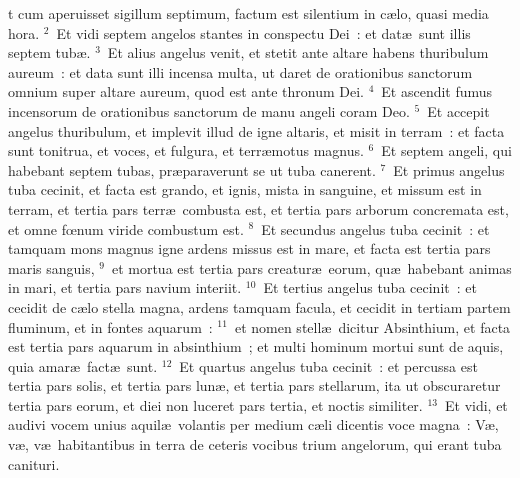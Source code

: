 \bchapter
{}t cum aperuisset sigillum septimum, factum est silentium in c\ae lo, quasi media hora.
${}^{2}$~Et vidi septem angelos stantes in conspectu Dei~: et dat\ae\ sunt illis septem tub\ae .
${}^{3}$~Et alius angelus venit, et stetit ante altare habens thuribulum aureum~: et data sunt illi incensa multa, ut daret de orationibus sanctorum omnium super altare aureum, quod est ante thronum Dei.
${}^{4}$~Et ascendit fumus incensorum de orationibus sanctorum de manu angeli coram Deo.
${}^{5}$~Et accepit angelus thuribulum, et implevit illud de igne altaris, et misit in terram~: et facta sunt tonitrua, et voces, et fulgura, et terr\ae motus magnus.
${}^{6}$~Et septem angeli, qui habebant septem tubas, pr\ae paraverunt se ut tuba canerent.
${}^{7}$~Et primus angelus tuba cecinit, et facta est grando, et ignis, mista in sanguine, et missum est in terram, et tertia pars terr\ae\ combusta est, et tertia pars arborum concremata est, et omne fœnum viride combustum est.
${}^{8}$~Et secundus angelus tuba cecinit~: et tamquam mons magnus igne ardens missus est in mare, et facta est tertia pars maris sanguis,
${}^{9}$~et mortua est tertia pars creatur\ae\ eorum, qu\ae\ habebant animas in mari, et tertia pars navium interiit.
${}^{10}$~Et tertius angelus tuba cecinit~: et cecidit de c\ae lo stella magna, ardens tamquam facula, et cecidit in tertiam partem fluminum, et in fontes aquarum~:
${}^{11}$~et nomen stell\ae\ dicitur Absinthium, et facta est tertia pars aquarum in absinthium~; et multi hominum mortui sunt de aquis, quia amar\ae\ fact\ae\ sunt.
${}^{12}$~Et quartus angelus tuba cecinit~: et percussa est tertia pars solis, et tertia pars lun\ae , et tertia pars stellarum, ita ut obscuraretur tertia pars eorum, et diei non luceret pars tertia, et noctis similiter.
${}^{13}$~Et vidi, et audivi vocem unius aquil\ae\ volantis per medium c\ae li dicentis voce magna~: V\ae , v\ae , v\ae\ habitantibus in terra de ceteris vocibus trium angelorum, qui erant tuba canituri.

